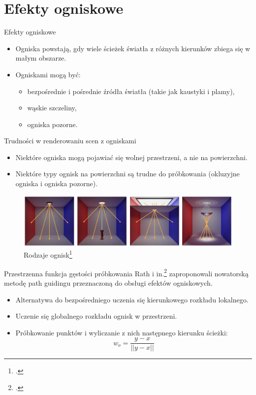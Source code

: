 \documentclass{beamer}
\begin{document}
\section{Efekty ogniskowe}
\begin{frame}{Efekty ogniskowe}
    \begin{itemize}
        \item Ogniska powstają, gdy wiele ścieżek światła z różnych kierunków zbiega się w małym obszarze.
        \item Ogniskami mogą być:
        \begin{itemize}
            \item bezpośrednie i pośrednie źródła światła (takie jak kaustyki i plamy),
            \item wąskie szczeliny,
            \item ogniska pozorne.
        \end{itemize}
    \end{itemize}
\end{frame}

\begin{frame}{Trudności w renderowaniu scen z ogniskami}
    \begin{itemize}
        \item Niektóre ogniska mogą pojawiać się wolnej przestrzeni, a nie na powierzchni.
        \item Niektóre typy ognisk na powierzchni są trudne do próbkowania (okluzyjne ogniska i ogniska pozorne).
    \end{itemize}
    \begin{figure}
        \centering
        \includegraphics[width=0.8\linewidth]{img/focal_effects.png}
        \caption{Rodzaje ognisk\footcite{Focal_Guiding}}
        \label{fig:enter-label}
    \end{figure}
\end{frame}
%

\begin{frame}{Przestrzenna funkcja gęstości próbkowania}
Rath i in.\footcite{Focal_Guiding} zaproponowali nowatorską metodę path guidingu przeznaczoną do obsługi efektów ogniskowych.
    \begin{itemize}
        \item Alternatywa do bezpośredniego uczenia się kierunkowego rozkładu lokalnego.
        \item Uczenie się globalnego rozkładu ognisk w przestrzeni.
        \item Próbkowanie punktów i wyliczanie z nich następnego kierunku ścieżki:
        $$ w_o = \frac{y-x}{||y-x||} $$
    \end{itemize}
\end{frame}
\end{document}

